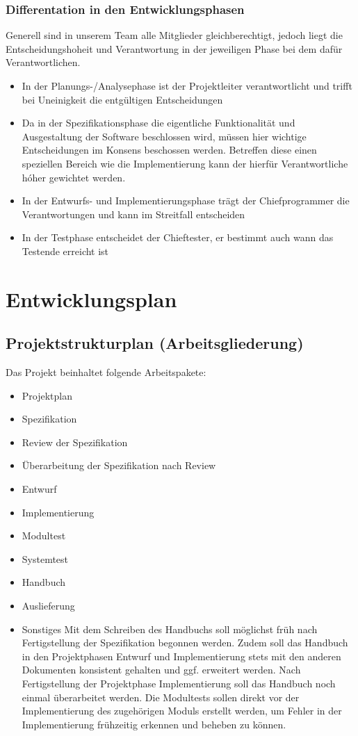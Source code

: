 \documentclass[a4paper,10pt]{scrartcl}
\begin{document}
\subsubsection{Differentation in den Entwicklungsphasen}
Generell sind in unserem Team alle Mitglieder gleichberechtigt, jedoch liegt die Entscheidungshoheit und Verantwortung in der jeweiligen Phase bei dem dafür Verantwortlichen.
\begin{itemize}
\item In der Planungs-/Analysephase ist der Projektleiter verantwortlicht und trifft bei Uneinigkeit die entgültigen Entscheidungen
\item Da in der Spezifikationsphase die eigentliche Funktionalität und Ausgestaltung der Software beschlossen wird, müssen hier wichtige Entscheidungen
      im Konsens beschossen werden. Betreffen diese einen speziellen Bereich wie die Implementierung kann der hierfür Verantwortliche hóher gewichtet werden.
\item In der Entwurfs- und Implementierungsphase trägt der Chiefprogrammer die Verantwortungen und kann im Streitfall entscheiden
\item In der Testphase entscheidet der Chieftester, er bestimmt auch wann das Testende erreicht ist
\end{itemize}

\section{Entwicklungsplan}
\subsection{Projektstrukturplan (Arbeitsgliederung)}
Das Projekt beinhaltet folgende Arbeitspakete:
\begin{itemize}
\item Projektplan
\item Spezifikation
\item Review der Spezifikation
\item Überarbeitung der Spezifikation nach Review
\item Entwurf
\item Implementierung
\item Modultest
\item Systemtest
\item Handbuch
\item Auslieferung
\item Sonstiges
Mit dem Schreiben des Handbuchs soll möglichst früh nach Fertigstellung der Spezifikation begonnen
werden. Zudem soll das Handbuch in den Projektphasen Entwurf und Implementierung stets mit
den anderen Dokumenten konsistent gehalten und ggf. erweitert werden. Nach Fertigstellung der
Projektphase Implementierung soll das Handbuch noch einmal überarbeitet werden.
Die Modultests sollen direkt vor der Implementierung des zugehörigen Moduls erstellt werden, um
Fehler in der Implementierung frühzeitig erkennen und beheben zu können.
\end{itemize}
\end{document}
